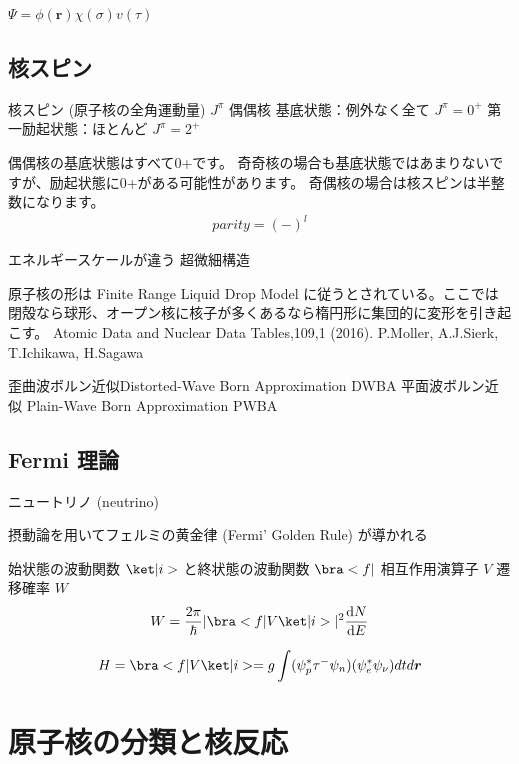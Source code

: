 \documentclass[uplatex,dvipdfmx,a4paper,11pt]{jlreq}
\newcommand{\rr}{\bm{r}}
\numberwithin{equation}{section}
\theoremstyle{definition}
\begin{document}
$\Psi = \phi(\rr)\chi(\sigma)v(\tau)$

\subsection{核スピン}
\begin{definition}
  核スピン (原⼦核の全⾓運動量) $J^\pi$
  偶偶核
  基底状態：例外なく全て $J^\pi = 0^+$
  第⼀励起状態：ほとんど $J^\pi = 2^+$
\end{definition}

偶偶核の基底状態はすべて0+です。
奇奇核の場合も基底状態ではあまりないですが、励起状態に0+がある可能性があります。
奇偶核の場合は核スピンは半整数になります。
\begin{align}
  parity = (-)^l
\end{align}

エネルギースケールが違う
超微細構造

原子核の形は Finite Range Liquid Drop Model に従うとされている。ここでは閉殻なら球形、オープン核に核子が多くあるなら楕円形に集団的に変形を引き起こす。
Atomic Data and Nuclear Data Tables,109,1 (2016).
P.Moller, A.J.Sierk, T.Ichikawa, H.Sagawa

歪曲波ボルン近似Distorted-Wave Born Approximation DWBA
平⾯波ボルン近似 Plain-Wave Born Approximation PWBA

\subsection{Fermi 理論}
ニュートリノ (neutrino)

摂動論を用いてフェルミの黄金律 (Fermi' Golden Rule) が導かれる

始状態の波動関数 $\ket|i>$ と終状態の波動関数 $\bra<f|$ 相互作用演算子 $V$
遷移確率 $W$
\begin{align}
  W = \frac{2\pi}{\hbar}|\bra<f|V\ket|i>|^2\diff{N}{E}
\end{align}

\begin{align}
  H = \bra<f|V\ket|i> = g\int(\psi_p^*\tau^-\psi_n)(\psi_e^*\psi_\nu)dt d\rr
\end{align}





\section{原子核の分類と核反応}
\end{document}

